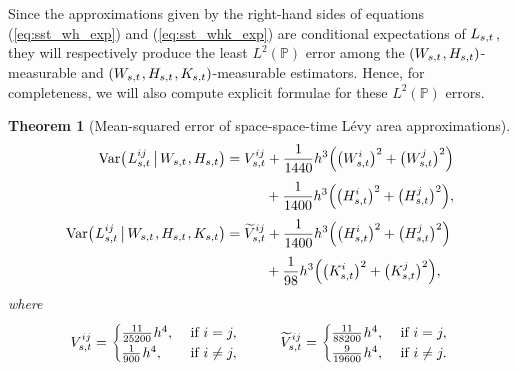 \documentclass[sn-mathphys-num]{sn-jnl}%
\newtheorem{theorem}{Theorem}%
\newcommand{\m}{\hspace{0.25mm}}
\newcommand{\var}{\mathrm{Var}}
\begin{document}
Since the approximations given by the right-hand sides of equations (\ref{eq:sst_wh_exp}) and (\ref{eq:sst_whk_exp}) are conditional expectations of $L_{s,t}\m$, they will respectively produce the least $L^2(\mathbb{P})$ error among the $(W_{s,t}\m, H_{s,t})$-measurable and $(W_{s,t}\m, H_{s,t}\m, K_{s,t})$-measurable estimators.
Hence, for completeness, we will also compute explicit formulae for these $L^2(\mathbb{P})$ errors.\medbreak
\begin{theorem}[Mean-squared error of space-space-time L\'{e}vy area approximations]\label{thm:sst_cond_var}
\begin{align}
\var\big(\m L_{s,t}^{ij}\,\big|\, W_{s,t}\m, H_{s,t}\big) & = V_{s,t}^{ij} + \frac{1}{1440}h^3\Big(\big(W_{s,t}^i\big)^2 + \big(W_{s,t}^j\big)^2\Big)\label{eq:cond_var_wh}\\[3pt]
&\hspace{10mm} + \frac{1}{1400}h^3 \Big(\big(H_{s,t}^i\big)^2 + \big(H_{s,t}^j\big)^2\Big),\nonumber\\[3pt]
\var\big(\m L_{s,t}^{ij}\,\big|\, W_{s,t}\m, H_{s,t}\m, K_{s,t}\big) & =  \widetilde{V}_{s,t}^{ij} + \frac{1}{1400}h^3\Big(\big(H_{s,t}^i\big)^2 + \big(H_{s,t}^j\big)^2\Big)\label{eq:cond_var_whk}\\[3pt]
&\hspace{10mm} + \frac{1}{98}h^3 \Big(\big(K_{s,t}^i\big)^2 + \big(K_{s,t}^j\big)^2\Big),\nonumber
\end{align}
where
\begin{align*}
V_{s,t}^{ij} = \begin{cases} \frac{11}{25200}\m h^4, & \text{ if } i = j,\\ \frac{1}{900}\m h^4, & \text{ if } i\neq j,\end{cases} \hspace{10mm} \widetilde{V}_{s,t}^{ij} = \begin{cases} \frac{11}{88200}\m h^4, & \text{ if } i = j,\\ \frac{9}{19600}\m h^4, & \text{ if } i\neq j.\end{cases}
\end{align*}
\end{theorem}
\end{document}
